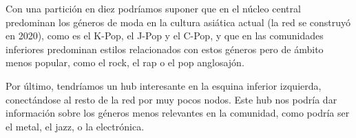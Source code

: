 Con una partición en diez podríamos suponer que en el núcleo central predominan los géneros de moda en la cultura asiática actual (la red se construyó en 2020), como es el K-Pop, el J-Pop y el C-Pop, y que en las comunidades inferiores predominan estilos relacionados con estos géneros pero de ámbito menos popular, como el rock, el rap o el pop anglosajón.

Por último, tendríamos un hub interesante en la esquina inferior izquierda, conectándose al resto de la red por muy pocos nodos. Este hub nos podría dar información sobre los géneros menos relevantes en la comunidad, como podría ser el metal, el jazz, o la electrónica.